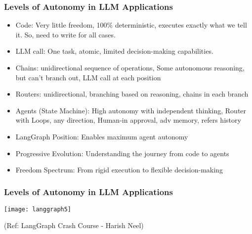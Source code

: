 \begin{frame}[fragile]\frametitle{Levels of Autonomy in LLM Applications}
      \begin{itemize}
        \item Code: Very little freedom, 100\% deterministic, executes exactly what we tell it. So, need to write for all cases.
        \item LLM call: One task, atomic, limited decision-making capabilities.
        \item Chains: unidirectional sequence of operations, Some autonomous reasoning, but can't branch out, LLM call at each position
		\item Routers: unidirectional, branching based on reasoning, chains in each branch
        \item Agents (State Machine): High autonomy with independent thinking, Router with Loops, any direction, Human-in approval, adv memory, refers history
        \item LangGraph Position: Enables maximum agent autonomy
        \item Progressive Evolution: Understanding the journey from code to agents
        \item Freedom Spectrum: From rigid execution to flexible decision-making
      \end{itemize}
\end{frame}


\begin{frame}[fragile]\frametitle{Levels of Autonomy in LLM Applications}

\begin{center}
\texttt{[image: langgraph5]}

{\tiny (Ref: LangGraph Crash Course - Harish Neel)}

\end{center}	  


\end{frame}



